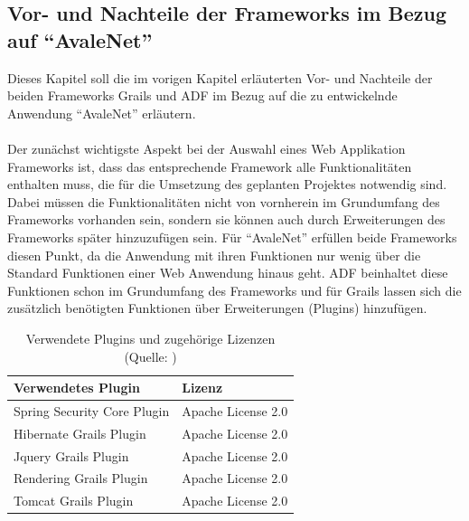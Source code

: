 \subsection{Vor- und Nachteile der Frameworks im Bezug auf "`AvaleNet"'}
Dieses Kapitel soll die im vorigen Kapitel erläuterten Vor- und Nachteile der beiden Frameworks Grails und ADF im Bezug auf die zu entwickelnde Anwendung "`AvaleNet"' erläutern.\\\\
Der zunächst wichtigste Aspekt bei der Auswahl eines Web Applikation Frameworks ist, dass das entsprechende Framework alle Funktionalitäten enthalten muss, die für die Umsetzung des geplanten Projektes notwendig sind. Dabei müssen die Funktionalitäten nicht von vornherein im Grundumfang des Frameworks vorhanden sein, sondern sie können auch durch Erweiterungen des Frameworks später hinzuzufügen sein. Für "`AvaleNet"' erfüllen beide Frameworks diesen Punkt, da die Anwendung mit ihren Funktionen nur wenig über die Standard Funktionen einer Web Anwendung hinaus geht. ADF beinhaltet diese Funktionen schon im Grundumfang des Frameworks und für Grails lassen sich die zusätzlich benötigten Funktionen über Erweiterungen (Plugins) hinzufügen. \begin{table}[h]
  \centering
    \begin{tabular}{l l}
	  \toprule
	  Verwendetes Plugin & Lizenz \\
	  \midrule
	  Spring Security Core Plugin &  Apache License 2.0 \\
	  Hibernate Grails Plugin &  Apache License 2.0  \\
	  Jquery Grails Plugin &  Apache License 2.0  \\
	  Rendering Grails Plugin &  Apache License 2.0  \\
	  Tomcat Grails Plugin &  Apache License 2.0  \\
	  \bottomrule
    \end{tabular}
    \caption{Verwendete Plugins und zugehörige Lizenzen (Quelle: \GrailsPlugins)}

\end{table}
